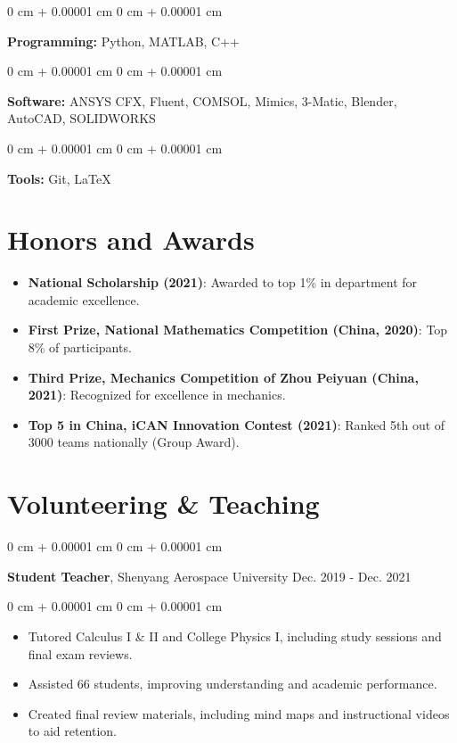 \documentclass[10pt, letterpaper]{article}
\newenvironment{highlights}{
    \begin{itemize}[
        topsep=0.10 cm,
        parsep=0.10 cm,
        partopsep=0pt,
        itemsep=0pt,
        leftmargin=0 cm + 10pt
    ]
}{
    \end{itemize}
} %
\newenvironment{onecolentry}{
    \begin{adjustwidth}{
        0 cm + 0.00001 cm
    }{
        0 cm + 0.00001 cm
    }
}{
    \end{adjustwidth}
} %
\newenvironment{twocolentry}[2][]{
    \onecolentry
    \def\secondColumn{#2}
    \setcolumnwidth{\fill, 4.5 cm}
    \begin{paracol}{2}
}{ 
    \switchcolumn \raggedleft \secondColumn
    \end{paracol}
    \endonecolentry
} %
\begin{document}
    \begin{onecolentry}
        \textbf{Programming:} Python, MATLAB, C++ 
    \end{onecolentry}

    \vspace{0.2 cm}

    \begin{onecolentry}
        \textbf{Software:} ANSYS CFX, Fluent, COMSOL, Mimics, 3-Matic, Blender, AutoCAD, SOLIDWORKS 
    \end{onecolentry}

    \vspace{0.2 cm}

    \begin{onecolentry}
        \textbf{Tools:} Git, \LaTeX 
    \end{onecolentry}


    \section{Honors and Awards}

    \begin{highlights}
        \item \textbf{National Scholarship (2021)}: Awarded to top 1\% in department for academic excellence.
        \item \textbf{First Prize, National Mathematics Competition (China, 2020)}: Top 8\% of participants.
        \item \textbf{Third Prize, Mechanics Competition of Zhou Peiyuan (China, 2021)}: Recognized for excellence in mechanics.
        \item \textbf{Top 5 in China, iCAN Innovation Contest (2021)}: Ranked 5th out of 3000 teams nationally (Group Award).
    \end{highlights}

    \vspace{0.2 cm}

    \section{Volunteering \& Teaching}

    \begin{twocolentry}{
        Dec. 2019 - Dec. 2021
    }
        \textbf{Student Teacher}, Shenyang Aerospace University\end{twocolentry}

    \vspace{0.10 cm}
    \begin{onecolentry}
        \begin{highlights}
            \item Tutored Calculus I \& II and College Physics I, including study sessions and final exam reviews.
            \item Assisted 66 students, improving understanding and academic performance.
            \item Created final review materials, including mind maps and instructional videos to aid retention.
        \end{highlights}
    \end{onecolentry}
\end{document}
